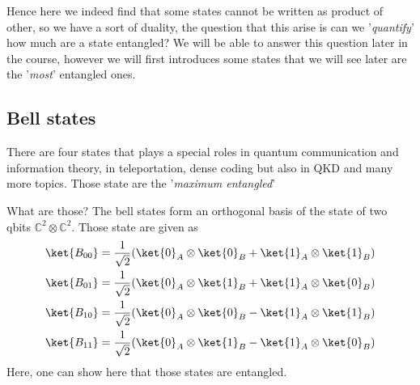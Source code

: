 Hence here we indeed find that some states cannot be written as product of other, so we have a sort of duality, the question that this arise is can we '\textit{quantify}' how much are a state entangled? We will be able to answer this question later in the course, however we will first introduces some states that we will see later are the '\textit{most}' entangled ones.
\subsection{Bell states}
There are four states that plays a special roles in quantum communication and information theory,  in teleportation, dense coding but also in QKD and many more topics. Those state are the '\textit{maximum entangled}'\\
\begin{parag}{What are those?}
    The bell states form an orthogonal basis of the state of two qbits $\mathbb{C}^2 \otimes \mathbb{C}^2$. Those state are given as 
	\begin{align*} 
		\ket{B_{00}} = \frac{1}{\sqrt{2}} \left(\ket{0}_A \otimes \ket{0}_B + \ket{1}_A \otimes \ket{1}_B\right) \\
		\ket{B_{01}} = \frac{1}{\sqrt{2}} \left(\ket{0}_A \otimes \ket{1}_B + \ket{1}_A \otimes \ket{0}_B\right) \\
		\ket{B_{10}} = \frac{1}{\sqrt{2}} \left(\ket{0}_A \otimes \ket{0}_B - \ket{1}_A \otimes \ket{1}_B\right)\\
		\ket{B_{11}} = \frac{1}{\sqrt{2}}\left(\ket{0}_A \otimes \ket{1}_B - \ket{1}_A \otimes \ket{0}_B\right)
	\end{align*}
	Here, one can show here that those states are entangled.

\end{parag}
